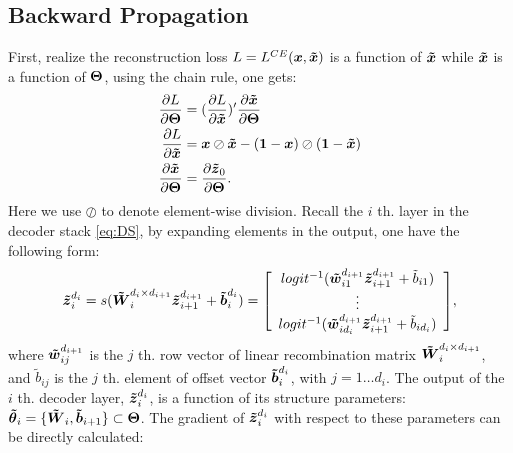 \subsection{Backward Propagation}
First, realize the reconstruction loss $L=L^{CE}(\xVO, \xVR)$ is a function of $\xVR$ while $\xVR$ is a function of $\Par$, using the chain rule, one gets:
\begin{equation*}
\begin{split}
  \PDV{L}{\Par} &= (\PDV{L}{\xVR})^{\prime} \PDV{\xVR}{\Par} \\
  \PDV{L}{\xVR} &= \xVO \oslash \xVR -  (\one{} - \xVO) \oslash (\one{} - \xVR) \\
  \PDV{\xVR}{\Par} &= \PDV{\zDC_0}{\Par}.
\end{split}
\end{equation*}
Here we use $\oslash$ to denote element-wise division. 
Recall the $i$ th. layer in the decoder stack \ref{eq:DS}, by expanding elements in the output, one have the following form:
\begin{equation*}
\begin{split}
  \zDC_i^{d_i} &= s(\WDC_i^{d_i \times d_{i+1}} \zDC_{i+1}^{d_{i+1}} + \bDC_i^{d_i})
  = \left[ \begin{array}{c}
    logit^{-1}(\wDC_{i1}^{d_{i+1}} \zDC_{i+1}^{d_{i+1}} + \tilde{b}_{i1}) \\
    \vdots \\
    logit^{-1}(\wDC_{id_i}^{d_{i+1}} \zDC_{i+1}^{d_{i+1}} + \tilde{b}_{id_i}) \\
  \end{array} \right] \\
\end{split},
\end{equation*}
where $\wDC_{ij}^{d_{i+1}}$ is the $j$ th. row vector of linear recombination matrix $\WDC_i^{d_i \times d_{i+1}}$, and $\tilde{b}_{ij}$ is the $j$ th. element of offset vector $\bDC_i^{d_i}$, with $j=1 \dots d_i$. The output of the $i$ th. decoder layer, $\oDi$, is a function of its structure parameters: $\pDC_i = \{\WDC_i, \bDC_{i+1}\} \subset \Par$. The gradient of $\oDi$ with respect to these parameters can be directly calculated:
